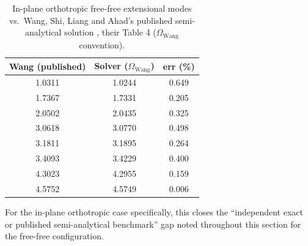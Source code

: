 \documentclass[11pt]{article}
\begin{document}
\begin{table}[!htb]\centering\small
\caption{In-plane orthotropic free-free extensional modes vs.\ Wang, Shi,
Liang and Ahad's published semi-analytical solution \cite{wangip2016},
their Table 4 ($\Omega_{\mathrm{Wang}}$ convention).}
\label{tab:wang}
\begin{tabular}{ccc}
\toprule Wang (published) & Solver ($\Omega_{\mathrm{Wang}}$) & err (\%)\\ \midrule
1.0311 & 1.0244 & 0.649\\
1.7367 & 1.7331 & 0.205\\
2.0502 & 2.0435 & 0.325\\
3.0618 & 3.0770 & 0.498\\
3.1811 & 3.1895 & 0.264\\
3.4093 & 3.4229 & 0.400\\
4.3023 & 4.2955 & 0.159\\
4.5752 & 4.5749 & 0.006\\
\bottomrule
\end{tabular}
\end{table}

For the in-plane orthotropic case specifically, this closes the
``independent exact or published semi-analytical benchmark'' gap noted
throughout this section for the free-free configuration.
\end{document}
